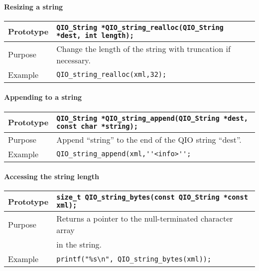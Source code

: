 \documentclass{article}
\newcommand{\QIOstring}{{\tt QIO\_String }}
\begin{document}
\paragraph{Resizing a string}

\begin{flushleft}
  \begin{tabular}{|l|l|}
  \hline
  Prototype      & \QIOstring \verb|*QIO_string_realloc(|\QIOstring \verb|*dest, int length);|\\
    \hline
  Purpose        & Change the length of the string with truncation if necessary. \\
   \hline
  Example        & \verb|QIO_string_realloc(xml,32);| \\
   \hline
 \end{tabular}
\end{flushleft}
%

\paragraph{Appending to a string}

\begin{flushleft}
  \begin{tabular}{|l|l|}
  \hline
  Prototype      & \QIOstring \verb|*QIO_string_append(|\QIOstring \verb|*dest, const char *string);|\\
    \hline
  Purpose        & Append ``string'' to the end of the QIO string ``dest''. \\
   \hline
  Example        & \verb|QIO_string_append(xml,''<info>'';| \\
   \hline
 \end{tabular}
\end{flushleft}
%

\paragraph{Accessing the string length}

\begin{flushleft}
  \begin{tabular}{|l|l|}
  \hline
  Prototype      & \verb|size_t QIO_string_bytes(const |\QIOstring \verb|*const xml);|\\
    \hline
  Purpose        & Returns a pointer to the null-terminated character array \\
                 & in the string. \\
   \hline
  Example        & \verb|printf("%s\n", QIO_string_bytes(xml));| \\
   \hline
 \end{tabular}
\end{flushleft}
%
\end{document}
